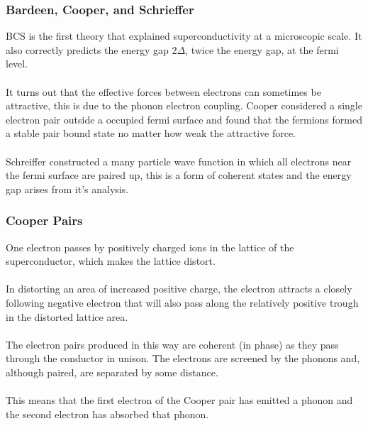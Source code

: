 \documentclass[10pt]{beamer}
\theoremstyle{definition}
\begin{document}
\begin{frame}
    \frametitle{Bardeen, Cooper, and Schrieffer}

    BCS is the first theory that explained superconductivity at a microscopic scale. It also correctly predicts
the energy gap 2$\Delta$, twice the energy gap, at the fermi level.
\\~\\
It turns out that the effective forces between electrons can sometimes be attractive, this
is due to the phonon electron coupling. Cooper considered a single electron pair outside a occupied fermi
surface and found that the fermions formed a stable pair bound state no matter how weak the attractive
force. 
\\~\\

Schreiffer constructed a many particle wave function in which all electrons near the fermi
surface are paired up, this is a form of coherent states and the energy gap arises from it's analysis. 


\end{frame}


\begin{frame}
    \frametitle{Cooper Pairs}

    One electron passes by positively charged ions in the lattice of the
    superconductor, which makes the lattice distort.
    \\~\\

    In distorting an area of increased positive charge, the electron
    attracts a closely following negative electron that will also pass
    along the relatively positive trough in the distorted lattice area.
\\~\\

    The electron pairs produced in this way are coherent (in phase) as 
    they pass through the conductor in unison. The electrons are screened 
    by the phonons and, although paired, are separated by some distance.
\\~\\


    This means that the first electron of the Cooper pair has emitted a 
    phonon and the second electron has absorbed that phonon.



\end{frame}
\end{document}
